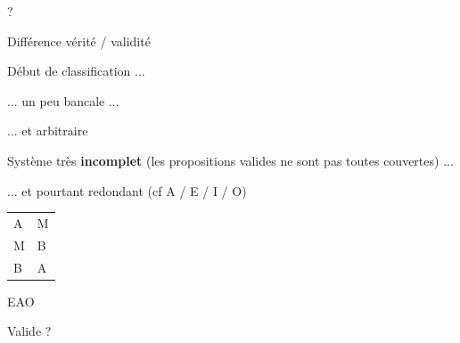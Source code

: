 \begin{frame}
	
	\begin{description}[labelindent=6pt,style=multiline,leftmargin=1.3in]
		 \setlength\itemsep{1em}

\item[Remarques] ?\pause
\item[Pts positifs] Différence vérité / validité\pause
\item[] Début de classification ...\pause
\item[Pts négatifs] ... un peu bancale ...\pause
\item[] ... et arbitraire\pause
\item[] Système très \textbf{incomplet} (les propositions valides ne sont pas toutes couvertes) ... \pause
\item[] ... et pourtant redondant (cf A / E / I / O)
\end{description}
\end{frame}
	
	


\begin{frame}
	
	\begin{description}[labelindent=6pt,style=multiline,leftmargin=1.3in]
		 \setlength\itemsep{1em}

\item[$4^{\grave{e}me}$ figure] \begin{tabular}{ll}
A & M \\
	M & B \\
\cline{1-2}
		B & A \\
\end{tabular}
\item[Mode] EAO \pause
\item[Question] Valide ? 

	\end{description} 
\end{frame}



